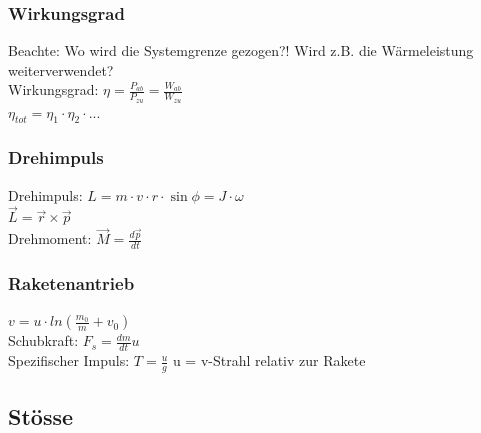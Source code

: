 \begin{multicols}{2}
\subsubsection{Wirkungsgrad}
Beachte: Wo wird die Systemgrenze gezogen?! Wird z.B. die Wärmeleistung weiterverwendet? \\
Wirkungsgrad: $\eta = \frac{P_{ab}}{P_{zu}} = \frac{W_{ab}}{W_{zu}}$ \\
$\eta_{tot} = \eta_{1} \cdot \eta_{2}  \cdot ...$


\subsubsection{Drehimpuls}
Drehimpuls: $L = m \cdot v \cdot r \cdot \sin{\phi} = J \cdot \omega$ \\
$\overrightarrow{L} = \overrightarrow{r} \times \overrightarrow{p}$ \\
Drehmoment: $ \overrightarrow{M} = \frac{d \overrightarrow{p}}{dt}
$

\subsubsection{Raketenantrieb}
$v = u \cdot ln(\frac{m_0}{m} + v_0) $ \\
Schubkraft: $F_s = \frac{dm}{dt} u$ \\
Spezifischer Impuls: $T = \frac{u}{g}$
u = v-Strahl relativ zur Rakete\\ 

\end{multicols}

\subsection{Stösse}

